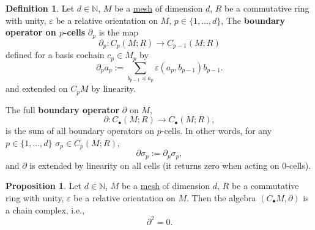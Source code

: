 \documentclass[fleqn]{article}
\theoremstyle{definition}
\newtheorem{proposition}[theorem]{Proposition}
\newtheorem{definition}[theorem]{Definition}
\newcommand{\N}{\mathbb{N}}
\begin{document}
\begin{definition}
  Let
    $d \in \N$,
    $M$ be a \hyperref[idec:mesh:definition]{mesh} of dimension $d$,
    $R$ be a commutative ring with unity,
    $\varepsilon$ be a relative orientation on $M$,
    $p \in \{1, ..., d\}$,
  The \textbf{boundary operator on $p$-cells} $\partial_p$ is the map
  \begin{equation}
     \partial_p \colon C_p(M; R) \to C_{p - 1}(M; R)
  \end{equation}
  defined for a basis cochain $c_p \in M_p$ by
  \begin{equation}
    \partial_p a_p
    := \sum_{b_{p - 1} \preceq a_p} \varepsilon(a_p, b_{p - 1}) b_{p - 1}.
  \end{equation}
  and extended on $C_p M$ by linearity.

  The full \textbf{boundary operator} $\partial$ on $M$,
  \begin{equation}
    \partial \colon C_\bullet(M; R) \to C_\bullet(M; R),
  \end{equation}
  is the sum of all boundary operators on $p$-cells.
  In other words, for any $p \in \{1, ..., d\}$ $\sigma_p \in C_p(M; R)$,
  \begin{equation}
    \partial \sigma_p := \partial_p \sigma_p,
  \end{equation}
  and $\partial$ is extended by linearity on all cells
  (it returns zero when acting on $0$-cells).
\end{definition}

\begin{proposition}
  Let
    $d \in \N$,
    $M$ be a \hyperref[idec:mesh:definition]{mesh} of dimension $d$,
    $R$ be a commutative ring with unity,
    $\varepsilon$ be a relative orientation on $M$.
  Then the algebra $(C_\bullet M, \partial)$ is a chain complex, i.e.,
  \begin{equation}
    \partial^2 = 0.
  \end{equation}
\end{proposition}
\end{document}
